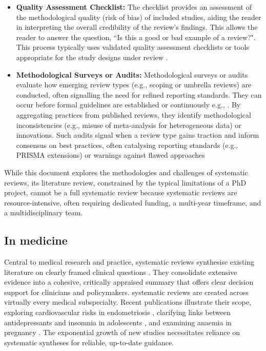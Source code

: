 \documentclass[10pt,oneside]{book}
\begin{document}
\begin{itemize}
    \item {\bf{Quality Assessment Checklist:}} The checklist provides an assessment of the methodological quality (risk of bias) of included studies, aiding the reader in interpreting the overall credibility of the review's findings. This allows the reader to answer the question, ``Is this a good or bad example of a review?". This process typically uses validated quality assessment checklists or tools appropriate for the study designs under review \cite{whiting_proposed_2017}.
    \item {\bf{Methodological Surveys or Audits:}} Methodological surveys or audits evaluate how emerging review types (e.g., scoping or umbrella reviews) are conducted, often signalling the need for refined reporting standards. They can occur before formal guidelines are established or continuously e.g., \cite{dalton_potential_2017, france_methodological_2014}. By aggregating practices from published reviews, they identify methodological inconsistencies (e.g., misuse of meta-analysis for heterogeneous data) or innovations. Such audits signal when a review type gains traction and inform consensus on best practices, often catalysing reporting standards (e.g., PRISMA extensions) or warnings against flawed approaches \cite{tricco_prisma_2018, sarkis-onofre_how_2021,rethlefsen_prisma-s_2021, rethlefsen_prisma-s_2021-1}
\end{itemize}

While this document explores the methodologies and challenges of systematic reviews, its literature review, constrained by the typical limitations of a PhD project, cannot be a full systematic review because systematic reviews are resource-intensive, often requiring dedicated funding, a multi-year timeframe, and a multidisciplinary team.
\subsection{In medicine}

Central to medical research and practice, systematic reviews synthesise existing literature on clearly framed clinical questions \cite{kranke_evidence-based_2010, higgins_cochrane_2019}. They consolidate extensive evidence into a cohesive, critically appraised summary that offers clear decision support for clinicians and policymakers. systematic reviews are created across virtually every medical subspecialty. Recent publications illustrate their scope, exploring cardiovascular risks in endometriosis \cite{parsa_endometriosis_2025}, clarifying links between antidepressants and insomnia in adolescents \cite{turkmen_systematic_2025}, and examining anaemia in pregnancy \cite{azzam_anemia_2025}. The exponential growth of new studies necessitates reliance on systematic syntheses for reliable, up-to-date guidance.
\end{document}
